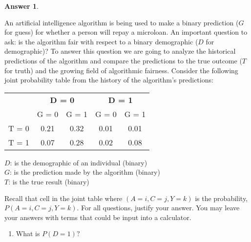 \documentclass[12pt]{article}
\renewcommand{\(}{\left(}
\renewcommand{\)}{\right)}
\theoremstyle{definition}
\newtheorem*{answer}{Answer}
\begin{document}
\begin{enumerate}
{\begin{shaded}
\begin{answer}
    \end{answer}
    \end{shaded}
    \newpage
    \item An artificial intelligence algorithm is being used to make a binary prediction ($G$ for guess) for whether a person will repay a microloan. An important question to ask: is the algorithm fair with respect to a binary demographic ($D$ for demographic)? To answer this question we are going to analyze the historical predictions of the algorithm and compare the predictions to the true outcome ($T$ for truth) and the growing field of algorithmic fairness.
    Consider the following joint probability table from the history of the algorithm's predictions:

    \begin{table}[h!]
        \centering
        \begin{tabular}{lcccc}\toprule
            &\multicolumn{2}{c}{\textbf{D = 0}}&\multicolumn{2}{c}{\textbf{D = 1}}
            \\\cmidrule(r){2-3}\cmidrule(r){4-5}   
            &G = 0&G = 1&G = 0&G = 1\\\midrule
            T = 0    
            & 0.21 
            & 0.32
            & 0.01 
            & 0.01\\
            T = 1   
            & 0.07
            & 0.28
            & 0.02
            & 0.08
            \\\bottomrule
        \end{tabular}
    \end{table}
    \begin{center}
    \vspace{-4mm}
        $D$: is the demographic of an individual (binary)\\
    $G$: is the  prediction made by the algorithm (binary)\\
    $T$: is the true  result (binary)\\
    \end{center}


    Recall that cell in the joint table where $( A = i, C = j, Y = k)$ is the  probability, $P(A = i, C = j, Y = k)$. For all questions, justify your answer. You may leave your answers with terms that could be input into a calculator. 

    \begin{enumerate}[label=\alph*.]
    
    \item What is $P(D = 1)?$
    

\end{enumerate}}
\end{enumerate}
\end{document}
